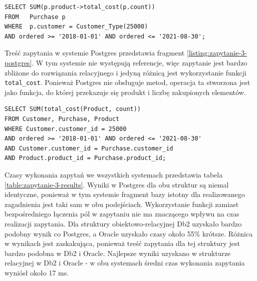 \documentclass[a4paper,twoside,12pt]{book}
\begin{document}
\begin{lstlisting}[style=SQL, caption={Zapytanie trzecie w Db2.}, label={listing:zapytanie-3-db2}, captionpos=b]
SELECT SUM(p.product->total_cost(p.count))
FROM   Purchase p
WHERE  p.customer = Customer_Type(25000)
AND ordered >= '2018-01-01' AND ordered <= '2021-08-30';
\end{lstlisting}

Treść zapytania w systemie Postgres przedstawia fragment \ref{listing:zapytanie-3-postgres}. W tym systemie nie występują referencje, więc zapytanie jest bardzo zbliżone do rozwiązania relacyjnego i jedyną różnicą jest wykorzystanie funkcji \lstinline{total_cost}. Ponieważ Postgres nie obsługuje metod, operacja ta stworzona jest jako funkcja, do której przekazuje się produkt i liczbę zakupionych elementów. 

\begin{minipage}{\linewidth}
\begin{lstlisting}[style=SQL, caption={Zapytanie trzecie w Postgres}, label={listing:zapytanie-3-postgres}, captionpos=b]
SELECT SUM(total_cost(Product, count))
FROM Customer, Purchase, Product
WHERE Customer.customer_id = 25000
AND ordered >= '2018-01-01' AND ordered <= '2021-08-30'
AND Customer.customer_id = Purchase.customer_id
AND Product.product_id = Purchase.product_id;
\end{lstlisting}
\end{minipage}

Czasy wykonania zapytań we wszystkich systemach przedstawia tabela \ref{table:zapytanie-3-results}. Wyniki w Postgres dla obu struktur są niemal identyczne, ponieważ w tym systemie fragment bazy istotny dla realizowanego zagadnienia jest taki sam w obu podejściach. Wykorzystanie funkcji zamiast bezpośredniego łączenia pól w zapytaniu nie ma znaczącego wpływu na czas realizacji zapytania. Dla struktury obiektowo-relacyjnej Db2 uzyskało bardzo podobny wynik co Postgres, a Oracle uzyskało czasy około 55\% krótsze. Różnica w wynikach jest zaskakująca, ponieważ treść zapytania dla tej struktury jest bardzo podobna w Db2 i Oracle. Najlepsze wyniki uzyskano w strukturze relacyjnej w Db2 i Oracle - w obu systemach średni czas wykonania zapytania wyniósł około 17 ms.
\end{document}
